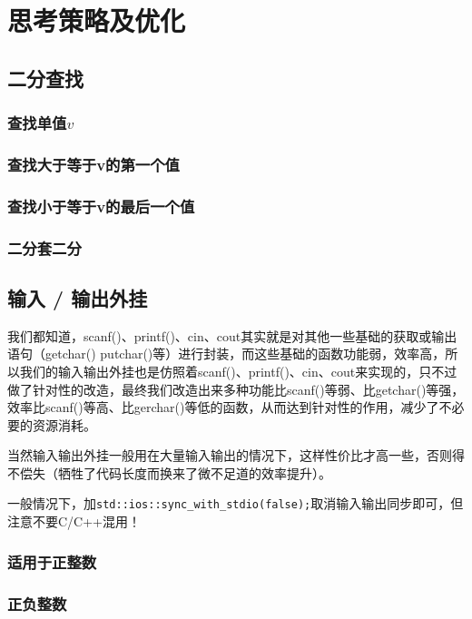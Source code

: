 
\chapter{思考策略及优化}
\label{tactics}


\section{二分查找}
\subsection{查找单值$v$}


\subsection{查找大于等于v的第一个值}


\subsection{查找小于等于v的最后一个值}


\subsection{二分套二分}



\section{输入 / 输出外挂}

我们都知道，scanf()、printf()、cin、cout其实就是对其他一些基础的获取或输出语句（getchar() putchar()等）进行封装，而这些基础的函数功能弱，效率高，所以我们的输入输出外挂也是仿照着scanf()、printf()、cin、cout来实现的，只不过做了针对性的改造，最终我们改造出来多种功能比scanf()等弱、比getchar()等强，效率比scanf()等高、比gerchar()等低的函数，从而达到针对性的作用，减少了不必要的资源消耗。

当然输入输出外挂一般用在大量输入输出的情况下，这样性价比才高一些，否则得不偿失（牺牲了代码长度而换来了微不足道的效率提升）。

一般情况下，加\verb|std::ios::sync_with_stdio(false);|取消输入输出同步即可，但注意不要C/C++混用！

\subsection{适用于正整数}



\subsection{正负整数}





\endinput %
